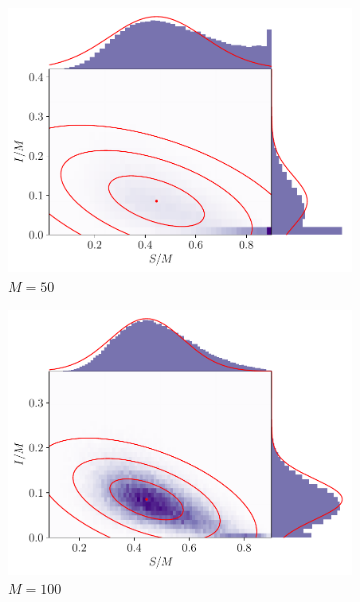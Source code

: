 \begin{figure}
	\centering
	\begin{subfigure}{0.49\textwidth}
		\includegraphics[width=\textwidth]{chp07_outlook/figures/sir/sir_pairwise_50}
		\caption{\(M = 50\)}
		\label{fig:sir_gauss_rels_1}
	\end{subfigure}
	\begin{subfigure}{0.49\textwidth}
		\includegraphics[width=\textwidth]{chp07_outlook/figures/sir/sir_pairwise_100}
		\caption{\(M = 100\)}
		\label{fig:sir_gauss_rels_2}
	\end{subfigure}
	\begin{subfigure}{0.49\textwidth}

\end{subfigure}
\end{figure}
